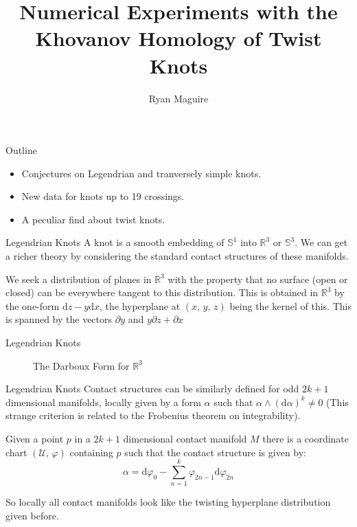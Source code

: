 \documentclass{beamer}
\title{Numerical Experiments with the Khovanov Homology of Twist Knots}
\author{Ryan Maguire}
\date{April 30, 2023\par\hfill\par{KiW 49 $\frac{0x0F}{0x10}$}}
\begin{document}
    \maketitle
    \begin{frame}{Outline}
        \begin{itemize}
            \item Conjectures on Legendrian and tranversely simple knots.
            \item New data for knots up to 19 crossings.
            \item A peculiar find about twist knots.
        \end{itemize}
    \end{frame}
    \begin{frame}{Legendrian Knots}
        A knot is a smooth embedding of $\mathbb{S}^{1}$ into $\mathbb{R}^{3}$
        or $\mathbb{S}^{3}$. We can get a richer theory by considering the
        standard contact structures of these manifolds.
        \par\hfill\par
        We seek a distribution of planes in $\mathbb{R}^{3}$ with the property
        that no surface (open or closed) can be everywhere tangent to this
        distribution. This is obtained in $\mathbb{R}^{3}$ by the one-form
        $\textrm{d}z-y\textrm{d}x$, the hyperplane at $(x,\,y,\,z)$ being the
        kernel of this. This is spanned by the vectors
        $\partial{y}$ and $y\partial{z}+\partial{x}$
    \end{frame}
    \begin{frame}{Legendrian Knots}
        \begin{figure}
            \centering
            \caption{The Darboux Form for $\mathbb{R}^{3}$}
        \end{figure}
    \end{frame}
    \begin{frame}{Legendrian Knots}
        Contact structures can be similarly defined for odd $2k+1$ dimensional
        manifolds, locally given by a form $\alpha$ such that
        $\alpha\land(\textrm{d}\alpha)^{k}\ne{0}$ (This strange criterion is
        related to the Frobenius theorem on integrability).
        \begin{theorem}[Darboux]
            Given a point $p$ in a $2k+1$ dimensional contact manifold $M$ there
            is a coordinate chart $(\mathcal{U},\,\varphi)$ containing $p$ such
            that the contact structure is given by:
            \begin{equation}
                \alpha=\textrm{d}\varphi_{0}-
                \sum_{n=1}^{k}\varphi_{2n-1}\textrm{d}\varphi_{2n}
            \end{equation}
        \end{theorem}
        So locally all contact manifolds look like the twisting hyperplane
        distribution given before.
    \end{frame}
\end{document}
